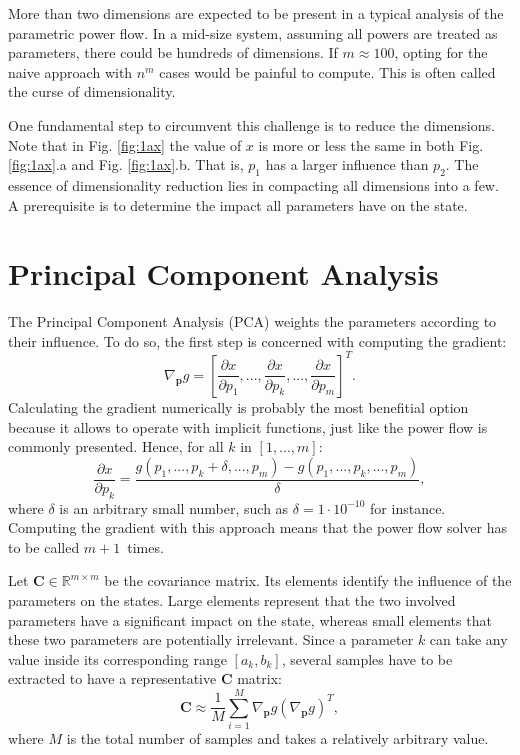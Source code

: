 More than two dimensions are expected to be present in a typical analysis of the parametric power flow. In a mid-size system, assuming all powers are treated as parameters, there could be hundreds of dimensions. If $m \approx 100$, opting for the naive approach with $n^m$ cases would be painful to compute. This is often called the curse of dimensionality. 

One fundamental step to circumvent this challenge is to reduce the dimensions. Note that in Fig. \ref{fig:1ax} the value of $x$ is more or less the same in both Fig. \ref{fig:1ax}.a and Fig. \ref{fig:1ax}.b. That is, $p_1$ has a larger influence than $p_2$. The essence of dimensionality reduction lies in compacting all dimensions into a few. A prerequisite is to determine the impact all parameters have on the state.  

\section{Principal Component Analysis}
The Principal Component Analysis (PCA) weights the parameters according to their influence. To do so, the first step is concerned with computing the gradient:
\begin{equation}
  \nabla_{\mathbf{p}}g = \left[\frac{\partial x}{\partial p_1}, ..., \frac{\partial x}{\partial p_k}, ..., \frac{\partial x}{\partial p_m} \right]^T.
  \label{eq:grad1}
\end{equation}
Calculating the gradient numerically is probably the most benefitial option because it allows to operate with implicit functions, just like the power flow is commonly presented. Hence, for all $k$ in $[1,...,m]$:
\begin{equation}
  \frac{\partial x}{\partial p_k} = \frac{g(p_1,...,p_k + \delta,...,p_m) - g(p_1,...,p_k,...,p_m)}{\delta},
  \label{eq:grad2}
\end{equation}
where $\delta$ is an arbitrary small number, such as $\delta=1\cdot 10^{-10}$ for instance. Computing the gradient with this approach means that the power flow solver has to be called $m+1$~times. 

Let $\mathbf{C}\in \mathbb{R}^{m \times m}$ be the covariance matrix. Its elements identify the influence of the parameters on the states. Large elements represent that the two involved parameters have a significant impact on the state, whereas small elements that these two parameters are potentially irrelevant. Since a parameter $k$ can take any value inside its corresponding range $[a_k,b_k]$, several samples have to be extracted to have a representative $\mathbf{C}$ matrix:
\begin{equation}
  \mathbf{C} \approx \frac{1}{M} \sum_{i=1}^M \nabla_{\mathbf{p}}g (\nabla_{\mathbf{p}}g)^T,
  \label{eq:C1}
\end{equation}
where $M$ is the total number of samples and takes a relatively arbitrary value. 

